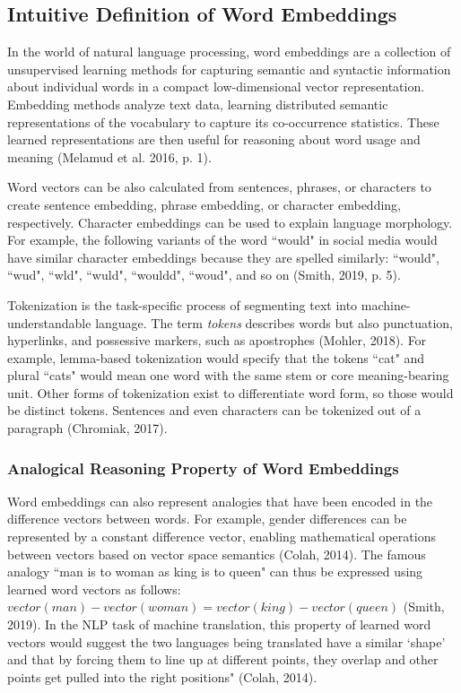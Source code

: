 \subsection{Intuitive Definition of Word Embeddings}
In the world of natural language processing, word embeddings are a collection of unsupervised learning methods for capturing semantic and syntactic information about individual words in a compact low-dimensional vector representation. Embedding methods analyze text data, learning distributed semantic representations of the vocabulary to capture its co-occurrence statistics. These learned representations are then useful for reasoning about word usage and meaning (Melamud et al. 2016, p. 1). 

Word vectors can be also calculated from sentences, phrases, or characters to create sentence embedding, phrase embedding, or character embedding, respectively. Character embeddings can be used to explain language morphology. For example, the following variants of the word ``would" in social media would have similar character embeddings because they are spelled similarly: ``would", ``wud", ``wld", ``wuld", ``wouldd", ``woud", and so on (Smith, 2019, p. 5). 

Tokenization is the task-specific process of segmenting text into machine-understandable language. The term \emph{tokens} describes words but also punctuation, hyperlinks, and possessive markers, such as apostrophes (Mohler, 2018). For example, lemma-based tokenization would specify that the tokens ``cat" and plural ``cats" would mean one word with the same stem or core meaning-bearing unit. Other forms of tokenization exist to differentiate word form, so those would be distinct tokens. Sentences and even characters can be tokenized out of a paragraph (Chromiak, 2017). 

\subsubsection{Analogical Reasoning Property of Word Embeddings}
Word embeddings can also represent analogies that have been encoded in the difference vectors between words. For example, gender differences can be represented by a constant difference vector, enabling mathematical operations between vectors based on vector space semantics (Colah, 2014). The famous analogy ``man is to woman as king is to queen" can thus be expressed using learned word vectors as follows: $vector(man) - vector(woman) = vector(king) - vector(queen)$ (Smith, 2019). In the NLP task of machine translation, this property of learned word vectors would suggest the two languages being translated have a similar `shape' and that by forcing them to line up at different points, they overlap and other points get pulled into the right positions" (Colah, 2014).

